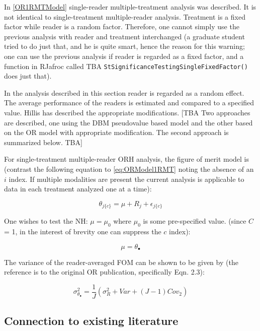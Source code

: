 \documentclass[
]{book}
\begin{document}
In \ref{OR1RMTModel} single-reader multiple-treatment analysis was described. It is not identical to single-treatment multiple-reader analysis. Treatment is a fixed factor while reader is a random factor. Therefore, one cannot simply use the previous analysis with reader and treatment interchanged (a graduate student tried to do just that, and he is quite smart, hence the reason for this warning; one can use the previous analysis if reader is regarded as a fixed factor, and a function in RJafroc called TBA \texttt{StSignificanceTestingSingleFixedFactor()} does just that).

In the analysis described in this section reader is regarded as a random effect. The average performance of the readers is estimated and compared to a specified value. Hillis has described the appropriate modifications. {[}TBA Two approaches are described, one using the DBM pseudovalue based model and the other based on the OR model with appropriate modification. The second approach is summarized below. TBA{]}

For single-treatment multiple-reader ORH analysis, the figure of merit model is (contrast the following equation to \eqref{eq:ORModel1RMT} noting the absence of an \(i\) index. If multiple modalities are present the current analysis is applicable to data in each treatment analyzed one at a time):

\begin{equation}
\theta_{j\{c\}}=\mu+R_j+\epsilon_{j\{c\}}
\label{eq:OrModel1T}
\end{equation}

One wishes to test the NH: \(\mu=\mu_0\) where \(\mu_0\) is some pre-specified value. (since \(C\) = 1, in the interest of brevity one can suppress the \(c\) index):

\begin{equation}
\mu=\theta_{\bullet}
\label{eq:OrModel1REstmu}
\end{equation}

The variance of the reader-averaged FOM can be shown \citep{RN1450} to be given by (the reference is to the original OR publication, specifically Eqn. 2.3):

\begin{equation}
\sigma_{\theta_{\bullet}}^{2}=\frac{1}{J}(\sigma_{R}^{2}+Var+(J-1)Cov_2)
\label{eq:VarThetaiDot}
\end{equation}

\hypertarget{connection-to-existing-literature}{%
\subsection{Connection to existing literature}\label{connection-to-existing-literature}}
\end{document}
